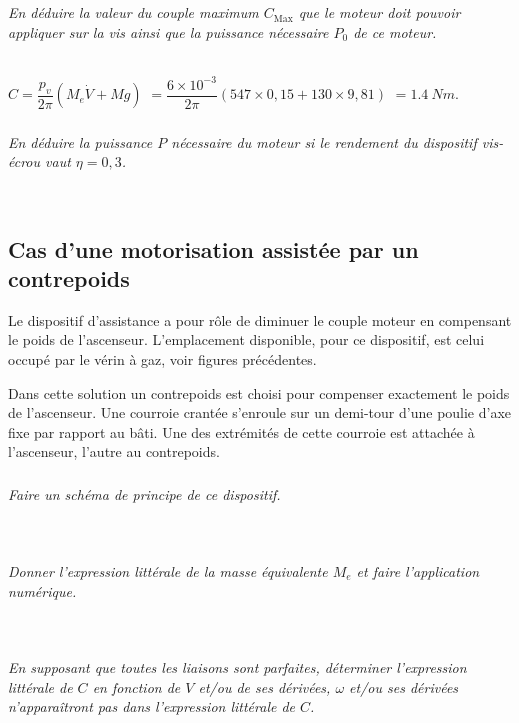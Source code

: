 \begin{multicols}{2}
\subparagraph{}\textit{En déduire la valeur du couple maximum $C_{\text{Max}}$ que le moteur doit pouvoir
appliquer sur la vis ainsi que la puissance nécessaire $P_0$ de ce moteur.}
\ifprof
\begin{corrige}~\\
$C = \dfrac{p_v}{2\pi}\left(M_e \dot{V} +Mg\right) $ $=\dfrac{6\times 10^{-3}}{2\pi}\left(547 \times 0,15 +130 \times 9,81\right)$ $=\SI{1,4}{Nm}$.

\end{corrige}
\else
\fi


\subparagraph{}\textit{En déduire la puissance $P$ nécessaire du moteur si le rendement du dispositif
vis-écrou vaut $\eta=0,3$.}
\ifprof
\begin{corrige}~\\
\end{corrige}
\else
\fi



\subsection*{Cas d’une motorisation assistée par un contrepoids}


Le dispositif d’assistance a pour rôle de diminuer le couple moteur en compensant le poids de l’ascenseur. L’emplacement disponible, pour ce dispositif, est celui occupé par le vérin à gaz, voir figures précédentes.

Dans cette solution un contrepoids est choisi pour compenser exactement
le poids de l’ascenseur. Une courroie crantée s’enroule sur un demi-tour d’une
poulie d’axe fixe par rapport au bâti. Une des extrémités de cette courroie est
attachée à l’ascenseur, l’autre au contrepoids.

\subparagraph{}\textit{Faire un schéma de principe de ce dispositif.}
\ifprof
\begin{corrige}~\\
\end{corrige}
\else
\fi

\subparagraph{}\textit{Donner l’expression littérale de la masse équivalente $M_e$ et faire l’application numérique.}
\ifprof
\begin{corrige}~\\
\end{corrige}
\else
\fi

\subparagraph{}\textit{En supposant que toutes les liaisons sont parfaites, déterminer l’expression littérale de $C$ en fonction de $V$ et/ou de ses dérivées, $\omega$ et/ou ses dérivées n’apparaîtront pas dans l’expression littérale de $C$.}
\ifprof
\begin{corrige}~\\
\end{corrige}
\else
\fi


\end{multicols}
